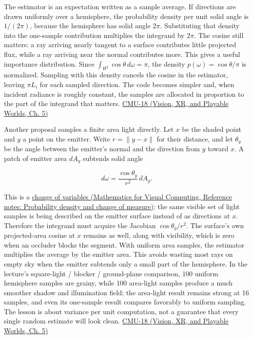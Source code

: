 The estimator is an expectation written as a sample average. If directions are drawn uniformly over a hemisphere, the probability density per unit solid angle is \(1/(2\pi)\), because the hemisphere has solid angle \(2\pi\). Substituting that density into the one-sample contribution multiplies the integrand by \(2\pi\). The cosine still matters: a ray arriving nearly tangent to a surface contributes little projected flux, while a ray arriving near the normal contributes more. This gives a useful importance distribution. Since \(\int_{H^2}\cos\theta\,d\omega=\pi\), the density \(p(\omega)=\cos\theta/\pi\) is normalized. Sampling with this density cancels the cosine in the estimator, leaving \(\pi L_i\) for each sampled direction. The code becomes simpler and, when incident radiance is roughly constant, the samples are allocated in proportion to the part of the integrand that matters. \href{../07-Vision-XR-and-Playable-Worlds/main.pdf\#nameddest=04-visual-computing-ii-ch036-cmu-18---monte-carlo-rendering}{CMU-18 (Vision, XR, and Playable Worlds, Ch. 5)}

Another proposal samples a finite area light directly. Let \(x\) be the shaded point and \(y\) a point on the emitter. Write \(r=\|y-x\|\) for their distance, and let \(\theta_y\) be the angle between the emitter's normal and the direction from \(y\) toward \(x\). A patch of emitter area \(dA_y\) subtends solid angle

\[
d\omega = \frac{\cos\theta_y}{r^2}\,dA_y.
\]

This is a \href{../02-Mathematics-for-Visual-Computing/main.pdf\#nameddest=appendix-4815cd87ab8b}{change of variables (Mathematics for Visual Computing, Reference notes: Probability density and change of measure)}: the same visible set of light samples is being described on the emitter surface instead of as directions at \(x\). Therefore the integrand must acquire the Jacobian \(\cos\theta_y/r^2\). The surface's own projected-area cosine at \(x\) remains as well, along with visibility, which is zero when an occluder blocks the segment. With uniform area samples, the estimator multiplies the average by the emitter area. This avoids wasting most rays on empty sky when the emitter subtends only a small part of the hemisphere. In the lecture's square-light / blocker / ground-plane comparison, 100 uniform hemisphere samples are grainy, while 100 area-light samples produce a much smoother shadow and illumination field; the area-light result remains strong at 16 samples, and even its one-sample result compares favorably to uniform sampling. The lesson is about variance per unit computation, not a guarantee that every single random estimate will look clean. \href{../07-Vision-XR-and-Playable-Worlds/main.pdf\#nameddest=04-visual-computing-ii-ch036-cmu-18---monte-carlo-rendering}{CMU-18 (Vision, XR, and Playable Worlds, Ch. 5)}

